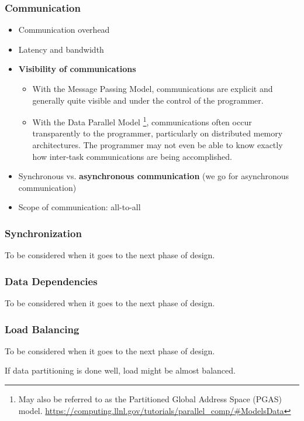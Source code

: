 \documentclass{beamer}
\begin{document}
\begin{frame}
\frametitle{Communication}

\begin{itemize}
  \item Communication overhead
  \item Latency and bandwidth
  \item \textbf{Visibility of communications}
    \begin{itemize}
      \item With the Message Passing Model, communications are explicit and generally quite visible and under the control of the programmer.
      \item With the Data Parallel Model \footnote{May also be referred to as the Partitioned Global Address Space (PGAS) model. 
      \url{https://computing.llnl.gov/tutorials/parallel\_comp/\#ModelsData}}, 
      communications often occur transparently to the programmer, particularly on distributed memory architectures. 
      The programmer may not even be able to know exactly how inter-task communications are being accomplished.
    \end{itemize}
  \item Synchronous vs. \textbf{asynchronous communication} (we go for asynchronous communication)
  \item Scope of communication: all-to-all
  
\end{itemize}
    
\end{frame}

\begin{frame}
\frametitle{Synchronization}

To be considered when it goes to the next phase of design.
  
\end{frame}

\begin{frame}
\frametitle{Data Dependencies}

To be considered when it goes to the next phase of design.
    
\end{frame}

\begin{frame}
\frametitle{Load Balancing}

To be considered when it goes to the next phase of design.

If data partitioning is done well, load might be almost balanced.
  
\end{frame}
\end{document}
